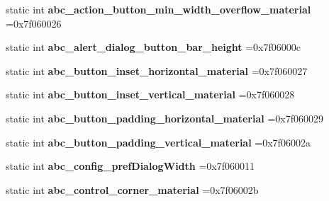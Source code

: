 \begin{DoxyCompactItemize}
\item 
\mbox{\label{classandroid_1_1support_1_1v4_1_1R_1_1dimen_af727e2920b6dbc4037b8e37b4a90add5}} 
static int {\bfseries abc\+\_\+action\+\_\+button\+\_\+min\+\_\+width\+\_\+overflow\+\_\+material} =0x7f060026
\item 
\mbox{\label{classandroid_1_1support_1_1v4_1_1R_1_1dimen_a04a23b041ab0737fea5b7cabd43b265f}} 
static int {\bfseries abc\+\_\+alert\+\_\+dialog\+\_\+button\+\_\+bar\+\_\+height} =0x7f06000c
\item 
\mbox{\label{classandroid_1_1support_1_1v4_1_1R_1_1dimen_a144dfdb92f8a4382ff3603038d408a4d}} 
static int {\bfseries abc\+\_\+button\+\_\+inset\+\_\+horizontal\+\_\+material} =0x7f060027
\item 
\mbox{\label{classandroid_1_1support_1_1v4_1_1R_1_1dimen_a1390eb1707e8fcc9f57076149100dcba}} 
static int {\bfseries abc\+\_\+button\+\_\+inset\+\_\+vertical\+\_\+material} =0x7f060028
\item 
\mbox{\label{classandroid_1_1support_1_1v4_1_1R_1_1dimen_aacee694a94e6a87e39ab8fec1e4636e9}} 
static int {\bfseries abc\+\_\+button\+\_\+padding\+\_\+horizontal\+\_\+material} =0x7f060029
\item 
\mbox{\label{classandroid_1_1support_1_1v4_1_1R_1_1dimen_a5938e4eb63fa62e86a4e0253c8fa1eed}} 
static int {\bfseries abc\+\_\+button\+\_\+padding\+\_\+vertical\+\_\+material} =0x7f06002a
\item 
\mbox{\label{classandroid_1_1support_1_1v4_1_1R_1_1dimen_ac485405d0e6b557aaba9660f9531f6ae}} 
static int {\bfseries abc\+\_\+config\+\_\+pref\+Dialog\+Width} =0x7f060011
\item 
\mbox{\label{classandroid_1_1support_1_1v4_1_1R_1_1dimen_a8362defff6943e5f51ba646e8407990c}} 
static int {\bfseries abc\+\_\+control\+\_\+corner\+\_\+material} =0x7f06002b
\item 

\end{DoxyCompactItemize}
